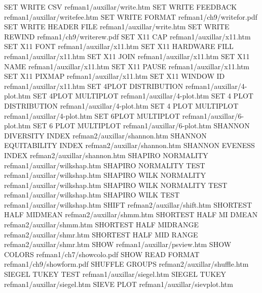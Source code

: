 SET WRITE CSV                           refman1/auxillar/write.htm
SET WRITE FEEDBACK                      refman1/auxillar/writefee.htm
SET WRITE FORMAT                        refman1/ch9/writefor.pdf
SET WRITE HEADER FILE                   refman1/auxillar/write.htm
SET WRITE REWIND                        refman1/ch9/writerew.pdf
SET X11 CAP                             refman1/auxillar/x11.htm
SET X11 FONT                            refman1/auxillar/x11.htm
SET X11 HARDWARE FILL                   refman1/auxillar/x11.htm
SET X11 JOIN                            refman1/auxillar/x11.htm
SET X11 NAME                            refman1/auxillar/x11.htm
SET X11 PAUSE                           refman1/auxillar/x11.htm
SET X11 PIXMAP                          refman1/auxillar/x11.htm
SET X11 WINDOW ID                       refman1/auxillar/x11.htm
SET 4PLOT DISTRIBUTION                  refman1/auxillar/4-plot.htm
SET 4PLOT MULTIPLOT                     refman1/auxillar/4-plot.htm
SET 4 PLOT DISTRIBUTION                 refman1/auxillar/4-plot.htm
SET 4 PLOT MULTIPLOT                    refman1/auxillar/4-plot.htm
SET 6PLOT MULTIPLOT                     refman1/auxillar/6-plot.htm
SET 6 PLOT MULTIPLOT                    refman1/auxillar/6-plot.htm
SHANNON DIVERSITY INDEX                 refman2/auxillar/shannon.htm
SHANNON EQUITABILITY INDEX              refman2/auxillar/shannon.htm
SHANNON EVENESS INDEX                   refman2/auxillar/shannon.htm
SHAPIRO NORMALITY                       refman1/auxillar/wilkshap.htm
SHAPIRO NORMALITY TEST                  refman1/auxillar/wilkshap.htm
SHAPIRO WILK NORMALITY                  refman1/auxillar/wilkshap.htm
SHAPIRO WILK NORMALITY TEST             refman1/auxillar/wilkshap.htm
SHAPIRO WILK TEST                       refman1/auxillar/wilkshap.htm
SHIFT                                   refman2/auxillar/shift.htm
SHORTEST HALF MIDMEAN                   refman2/auxillar/shmm.htm
SHORTEST HALF MI DMEAN                  refman2/auxillar/shmm.htm
SHORTEST HALF MIDRANGE                  refman2/auxillar/shmr.htm
SHORTEST HALF MID RANGE                 refman2/auxillar/shmr.htm
SHOW                                    refman1/auxillar/psview.htm
SHOW COLORS                             refman1/ch7/showcolo.pdf
SHOW READ FORMAT                        refman1/ch9/showform.pdf
SHUFFLE GROUPS                          refman2/auxillar/shuffle.htm
SIEGEL TUKEY TEST                       refman1/auxillar/siegel.htm
SIEGEL TUKEY                            refman1/auxillar/siegel.htm
SIEVE PLOT                              refman1/auxillar/sievplot.htm
